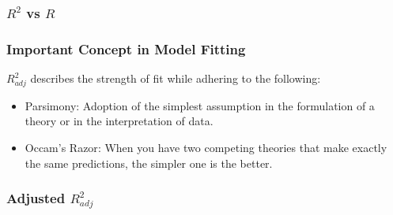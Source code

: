 \documentclass[handout]{beamer}
\newcommand{\blue}[1]{\textcolor{blue2}{#1}}
\begin{document}
\begin{frame}[fragile]
\frametitle{$R^2$ vs $R$}


\end{frame}


\begin{frame}[fragile]
\frametitle{Important Concept in Model Fitting}

$R^2_{adj}$ describes the strength of fit while adhering to the following:
\begin{itemize}
\pause\item \blue{Parsimony}:  Adoption of the simplest assumption in the formulation of a theory or in the interpretation of data.
\pause\item \blue{Occam's Razor}: When you have two competing theories that make exactly the same predictions, the simpler one is the better.
\end{itemize}


\end{frame}


\begin{frame}[fragile]
\frametitle{Adjusted $R^2_{adj}$}

%
%
%

\end{frame}


%
%
\end{document}
